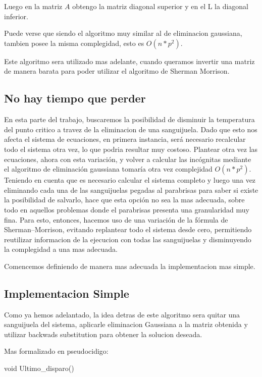 Luego en la matriz $A$ obtengo la matriz diagonal superior y en el L la diagonal inferior.

Puede verse que siendo el algoritmo muy similar al de eliminacion gaussiana, tambien posee la misma complegidad, esto es $O(n*p^2)$.

Este algoritmo sera utilizado mas adelante, cuando queramos invertir una matriz de manera barata para poder utilizar el algoritmo de Sherman Morrison.

\subsection{No hay tiempo que perder}

En esta parte del trabajo, buscaremos la posibilidad de disminuir la temperatura del punto critico a travez de la eliminacion de una sanguijuela. Dado que esto nos afecta el sistema de ecuaciones, en primera instancia, ser\'a necesario recalcular todo el sistema otra vez, lo que podria resultar muy costoso. Plantear otra vez las ecuaciones, ahora con esta variaci\'on, y volver a calcular las inc\'ognitas mediante el algoritmo de eliminaci\'on gaussiana tomar\'ia otra vez complejidad $O(n*p^2)$. Teniendo en cuenta que es necesario calcular el sistema completo y luego una vez eliminando cada una de las sanguijuelas pegadas al parabrisas para saber si existe la posibilidad de salvarlo, hace que esta opci\'on no sea la mas adecuada, sobre todo en aquellos problemas donde el parabrisas presenta una granularidad muy fina. Para esto, entonces, hacemos uso de una variaci\'on de la f\'ormula de Sherman–Morrison, evitando replantear todo el sistema desde cero, permitiendo reutilizar informacion de la ejecucion con todas las sanguijuelas y disminuyendo la complegidad a una mas adecuada.

Comencemos definiendo de manera mas adecuada la implementacion mas simple.

\subsection{Implementacion Simple}

Como ya hemos adelantado, la idea detras de este algoritmo sera quitar una sanguijuela del sistema, aplicarle eliminacion Gaussiana a la matriz obtenida y utilizar backwads substitution para obtener la solucion deseada.

Mas formalizado en pseudocidigo:

\begin{algorithm}
\begin{algorithmic}[1]\parskip=1mm
\caption{void Ultimo\_disparo()}
\end{algorithmic}
\end{algorithm}

